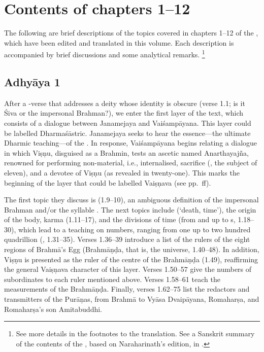 \section{Contents of chapters 1--12}\label{contentsof1_12}

The following are brief descriptions of the topics covered in chapters 
1--12 of the \VSS, which have been edited and translated in this volume. 
Each description is accompanied by brief discussions and some analytical remarks.%
		\footnote{See more details in the footnotes to the translation.
                          See a Sanskrit summary of the contents of the \VSS, based on Naraharinath's edition,
                          in . }

					
\subsection*{Adhyāya 1}\label{contents_of_ch01}
After a -verse that addresses a 
deity whose identity is obscure\linebreak
(verse 1.1; is it Śiva or the 
impersonal Brahman?), we enter the first layer 
of the text, which consists of a dialogue between Janamejaya and 
Vaiśampāyana. This layer could be labelled Dharmaśāstric.
Janamejaya seeks to hear the essence---the ultimate Dharmic 
teaching---of the \MBh. In response, Vaiśampāyana begins relating 
a dialogue in which Viṣṇu, disguised as a Brahmin, 
tests an ascetic named Anarthayajña, renowned for performing 
non-material, i.e., internalised, sacrifice (, 
the subject of  eleven), and 
a devotee of Viṣṇu (as revealed in  twenty-one). 
This marks the beginning of the layer that could be labelled Vaiṣṇava (see pp.~\pageref{structure}ff). 

The first topic they discuss is  (1.9--10), an
ambiguous definition of the impersonal Brahman and/or the syllable . 
The next topics include  (`death, time'), the origin of the body, karma (1.11--17), 
and the divisions of time (from  and  up to s, 1.18--30), 
which lead to a teaching on numbers, ranging from one up to 
two hundred quadrillion (, 1.31--35).
Verses 1.36--39 introduce a list of the rulers of the eight 
regions of Brahmā's Egg (Brahmāṇḍa, that is, the universe, 1.40--48). 
In addition, Viṣṇu is presented as the ruler of the centre of the Brahmāṇḍa (1.49),  
reaffirming the general Vaiṣṇava character of this layer. 
Verses 1.50--57 give the numbers of subordinates to each ruler mentioned above. 
Verses 1.58--61 teach the measurements of the Brahmāṇḍa. 
Finally, verses 1.62--75 list the redactors and transmitters of the Purāṇas, 
from Brahmā to Vyāsa Dvaipāyana, Romaharṣa, and Romaharṣa's son Amitabuddhi.


